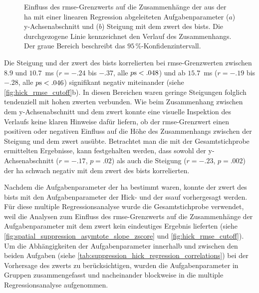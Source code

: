 \documentclass[11pt, twoside, a4paper]{book}		%
\begin{document}
\begin{figure}[htbp]
	\centering
	\begin{adjustbox}{width=1\textwidth}
	\end{adjustbox}
	\newline
	\begin{adjustbox}{width=1\textwidth}
	\end{adjustbox}
	
	\caption[Einfluss des \gls{rmse}-Grenzwerts der \gls{ha} auf den Zusammenhang zwischen dem y-Ach\-sen\-ab\-schnitt, der Steigung und dem \gls{zwert} des \gls{bist}s]{Einfluss des \gls{rmse}-Grenzwerts auf die Zusammenhänge der aus der \gls{ha} mit einer linearen Regression abgeleiteten Aufgabenparameter ($a$) y-Ach\-sen\-ab\-schnitt und ($b$) Steigung mit dem \gls{zwert} des \gls{bist}s. Die durchgezogene Linie kennzeichnet den Verlauf des Zusammenhangs. Der graue Bereich beschreibt das $95\,\%$-Konfidenzintervall.}
	\label{fig:hick_rmse_cutoff}
\end{figure}

Die Steigung und der \gls{zwert} des \gls{bist}s korrelierten bei \gls{rmse}-Grenzwerten zwischen $8.9$ und $10.7$~ms ($r = -.24$ bis $ -.37$, alle $p\textnormal{s} < .048$) und ab $15.7$~ms ($r = -.19$ bis $ -.28$, alle $p\textnormal{s} < .046$) signifikant negativ miteinander (siehe \autoref{fig:hick_rmse_cutoff}b). In diesen Bereichen waren geringe Steigungen folglich tendenziell mit hohen \gls{zwert}en verbunden. Wie beim Zusammenhang zwischen dem y-Ach\-sen\-ab\-schnitt und dem \gls{zwert} konnte eine visuelle Inspektion des Verlaufs keine klaren Hinweise dafür liefern, ob der \gls{rmse}-Grenzwert einen positiven oder negativen Einfluss auf die Höhe des Zusammenhangs zwischen der Steigung und dem \gls{zwert} ausübte.
Betrachtet man die mit der Gesamtstichprobe ermittelten Ergebnisse, kann festgehalten werden, dass sowohl der y-Ach\-sen\-ab\-schnitt ($r=-.17$, $p=.02$) als auch die Steigung ($r=-.23$, $p=.002$) der \gls{ha} schwach negativ mit dem \gls{zwert} des \gls{bist}s korrelierten.

Nachdem die Aufgabenparameter der \gls{ha} bestimmt waren, konnte der \gls{zwert} des \gls{bist}s mit den Aufgabenparameter der Hick- und der \gls{ssauf} vorhergesagt werden. Für diese multiple Regressionsanalyse wurde die Gesamtstichprobe verwendet, weil die Analysen zum Einfluss des \gls{rmse}-Grenzwerts auf die Zusammenhänge der Aufgabenparameter mit dem \gls{zwert} kein eindeutiges Ergebnis lieferten (siehe \autoref{fig:spatial_suppression_asymtote_slope_zscore} und \autoref{fig:hick_rmse_cutoff}). Um die Abhängigkeiten der Aufgabenparameter innerhalb und zwischen den beiden Aufgaben (siehe \autoref{tab:suppression_hick_regression_correlations}) bei der Vorhersage des \gls{zwert}s zu berücksichtigen, wurden die Aufgabenparameter in Gruppen zusammengefasst und nacheinander blockweise in die multiple Regressionsanalyse aufgenommen. 
\end{document}
